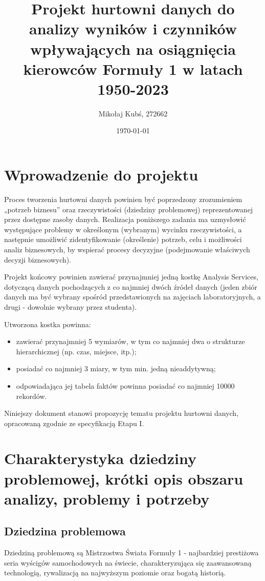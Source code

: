 \documentclass[a4paper,12pt]{article}
\title{Projekt hurtowni danych do analizy wyników i czynników wpływających na osiągnięcia kierowców Formuły 1 w latach 1950-2023}
\author{Mikołaj Kubś, 272662}
\date{\today}
\begin{document}
\maketitle
\tableofcontents
\newpage

\section{Wprowadzenie do projektu}
Proces tworzenia hurtowni danych powinien być poprzedzony zrozumieniem „potrzeb biznesu” oraz rzeczywistości (dziedziny problemowej) reprezentowanej przez dostępne zasoby danych. Realizacja poniższego zadania ma uzmysłowić występujące problemy w określonym (wybranym) wycinku rzeczywistości, a następnie umożliwić zidentyfikowanie (określenie) potrzeb, celu i możliwości analiz biznesowych, by wspierać procesy decyzyjne (podejmowanie właściwych decyzji biznesowych).

Projekt końcowy powinien zawierać przynajmniej jedną kostkę Analysis Services, dotyczącą danych pochodzących z co najmniej dwóch źródeł danych (jeden zbiór danych ma być wybrany spośród przedstawionych na zajęciach laboratoryjnych, a drugi - dowolnie wybrany przez studenta).

Utworzona kostka powinna:
\begin{itemize}
  \item zawierać przynajmniej 5 wymiarów, w tym co najmniej dwa o strukturze hierarchicznej (np. czas, miejsce, itp.);
  \item posiadać co najmniej 3 miary, w tym min. jedną nieaddytywną;
  \item odpowiadająca jej tabela faktów powinna posiadać co najmniej 10000 rekordów.
\end{itemize}
Niniejszy dokument stanowi propozycję tematu projektu hurtowni danych, opracowaną zgodnie ze specyfikacją Etapu I.

\section{Charakterystyka dziedziny problemowej, krótki opis obszaru analizy, problemy i potrzeby}

\subsection{Dziedzina problemowa}
Dziedziną problemową są Mistrzostwa Świata Formuły 1 - najbardziej prestiżowa seria wyścigów samochodowych na świecie, charakteryzująca się zaawansowaną technologią, rywalizacją na najwyższym poziomie oraz bogatą historią.
\end{document}
